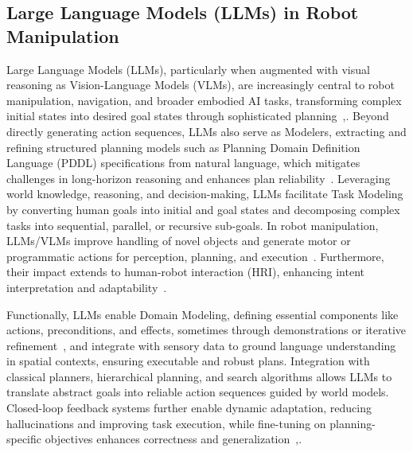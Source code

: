 \documentclass[12pt]{extarticle}
\begin{document}
\subsection{Large Language Models (LLMs) in Robot Manipulation}
Large Language Models (LLMs), particularly when augmented with visual reasoning as Vision-Language Models (VLMs), are increasingly central to robot manipulation, navigation, and broader embodied AI tasks, transforming complex initial states into desired goal states through sophisticated planning~\cite{plangenllm},\cite{eval-application-challenges-llms}. Beyond directly generating action sequences, LLMs also serve as Modelers, extracting and refining structured planning models such as Planning Domain Definition Language (PDDL) specifications from natural language, which mitigates challenges in long-horizon reasoning and enhances plan reliability~\cite{llm-as-planning-formalizers}. Leveraging world knowledge, reasoning, and decision-making, LLMs facilitate Task Modeling by converting human goals into initial and goal states and decomposing complex tasks into sequential, parallel, or recursive sub-goals. In robot manipulation, LLMs/VLMs improve handling of novel objects and generate motor or programmatic actions for perception, planning, and execution~\cite{plangenllm}. Furthermore,
their impact extends to human-robot interaction (HRI), enhancing intent interpretation and adaptability~\cite{eval-application-challenges-llms}.

Functionally, LLMs enable Domain Modeling, defining essential components like actions, preconditions, and effects, sometimes through demonstrations or iterative refinement~\cite{llm-as-planning-formalizers}, and integrate with sensory data to ground language understanding in spatial contexts, ensuring executable and robust plans. Integration with classical planners, hierarchical planning, and search algorithms allows LLMs to translate abstract goals into reliable action sequences guided by world models. Closed-loop feedback systems further enable dynamic adaptation, reducing hallucinations and improving task execution, while fine-tuning on planning-specific objectives enhances correctness and generalization~\cite{plangenllm},\cite{llm-as-planning-formalizers}. 
\end{document}

